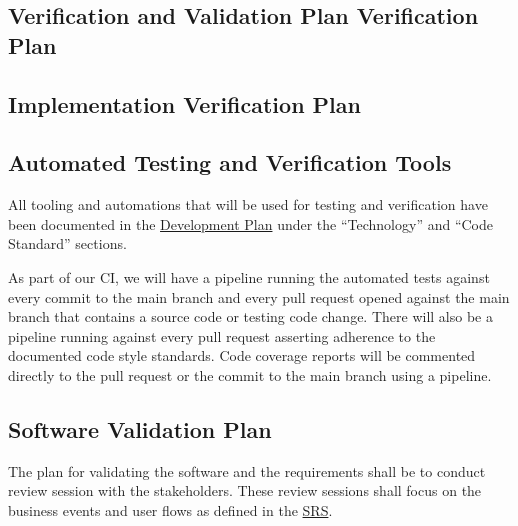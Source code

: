 \documentclass[12pt, titlepage]{article}
\begin{document}
\subsection{Verification and Validation Plan Verification Plan}




\subsection{Implementation Verification Plan}



\subsection{Automated Testing and Verification Tools}

All tooling and automations that will be used for testing and verification have been documented in
the
\href{https://github.com/arkinmodi/project-sayyara/blob/main/docs/DevelopmentPlan/DevelopmentPlan.pdf}{Development
	Plan} under the ``Technology'' and ``Code Standard'' sections.

As part of our CI, we will have a pipeline running the automated tests against every commit to the
main branch and every pull request opened against the main branch that contains a source code or
testing code change. There will also be a pipeline running against every pull request asserting
adherence to the documented code style standards. Code coverage reports will be commented directly
to the pull request or the commit to the main branch using a pipeline.

\subsection{Software Validation Plan}

The plan for validating the software and the requirements shall be to conduct review session with
the stakeholders. These review sessions shall focus on the business events and user flows as
defined in the \href{https://github.com/arkinmodi/project-sayyara/blob/main/docs/SRS/SRS.pdf}{SRS}.
\end{document}
